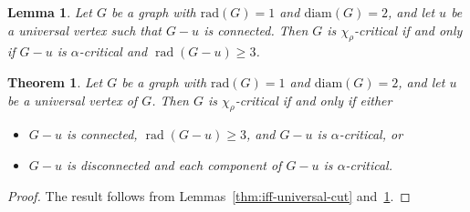 \documentclass[10pt,a4paper]{amsart}
\newtheorem{lemma}{Lemma}
\newtheorem{theorem}{Theorem}
\begin{document}
\begin{lemma}\label{thm:iff-universal}
Let $G$ be a graph with $\mathrm{rad}(G) = 1$  and  $\mathrm{diam}(G) = 2$, and let $u$ be a universal vertex such that $G-u$ is connected. 
Then $G$ is $\chi_\rho$-critical if and only if $G-u$ is $\alpha$-critical and  $\operatorname{rad}(G-u) \geq 3$. 
\end{lemma}

\begin{theorem}\label{thm:12}
Let $G$ be a graph with $\mathrm{rad}(G) = 1$  and  $\mathrm{diam}(G) = 2$, and let $u$ be a universal vertex of $G$. 
Then $G$ is $\chi_\rho$-critical if and only if either
\begin{itemize}
\item[(i)] $G-u$ is connected, $\operatorname{rad}(G-u)\ge 3$, and $G-u$ is $\alpha$-critical, or
\item[(ii)] $G-u$ is disconnected and each component of $G-u$ is $\alpha$-critical.
\end{itemize}
\end{theorem}

\begin{proof}
The result follows from Lemmas~\ref{thm:iff-universal-cut} and~\ref{thm:iff-universal}.
\end{proof}
\end{document}
